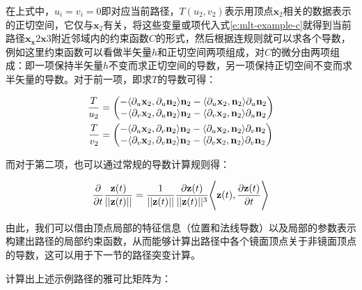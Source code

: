 在上式中，$u_i=v_i=0$即对应当前路径，$T(u_2,v_2)$表示用顶点$\mathbf{x}_2$相关的数据表示的正切空间，它仅与$\mathbf{x}_2$有关，将这些变量或项代入式\ref{e:mlt-example-c}就得到当前路径$\mathbf{x}_\mathbf{x}2\mathbf{x}3$附近邻域内的约束函数$C$的形式，然后根据连规则就可以求各个导数，例如这里约束函数可以看做半矢量$h$和正切空间两项组成，对$C$的微分由两项组成：即一项保持半矢量$h$不变而求正切空间的导数，另一项保持正切空间不变而求半矢量的导数。对于前一项，即求$T$的导数可得：

\begin{equation}
\begin{aligned}
	\frac{T}{u_2}&=\begin{pmatrix}
		-\langle{\rm \partial}_u\mathbf{x}_2,{\rm \partial}_u\mathbf{n}_2\rangle\mathbf{n}_2-\langle{\rm \partial}_u\mathbf{x}_2,\mathbf{n}_2\rangle{\rm \partial}_u\mathbf{n}_2\\
		-\langle{\rm \partial}_v\mathbf{x}_2,{\rm \partial}_u\mathbf{n}_2\rangle\mathbf{n}_2-\langle{\rm \partial}_v\mathbf{x}_2,\mathbf{n}_2\rangle{\rm \partial}_u\mathbf{n}_2
	\end{pmatrix}\\
	\frac{T}{v_2}&=\begin{pmatrix}
		-\langle{\rm \partial}_u\mathbf{x}_2,{\rm \partial}_v\mathbf{n}_2\rangle\mathbf{n}_2-\langle{\rm \partial}_u\mathbf{x}_2,\mathbf{n}_2\rangle{\rm \partial}_v\mathbf{n}_2\\
		-\langle{\rm \partial}_v\mathbf{x}_2,{\rm \partial}_v\mathbf{n}_2\rangle\mathbf{n}_2-\langle{\rm \partial}_v\mathbf{x}_2,\mathbf{n}_2\rangle{\rm \partial}_v\mathbf{n}_2
	\end{pmatrix}
\end{aligned}
\end{equation}

\noindent 而对于第二项，也可以通过常规的导数计算规则得：

\begin{equation}
	\frac{{\rm \partial}}{{\rm \partial} t}\frac{\mathbf{z}(t)}{||\mathbf{z}(t)||}=\frac{1}{||\mathbf{z}(t)||}\frac{{\rm \partial}\mathbf{z}(t)}{||\mathbf{z}(t)||^{3}}\Bigg\langle\mathbf{z}(t),\frac{{\rm \partial}\mathbf{z}(t)}{{\rm \partial} t}\Bigg\rangle
\end{equation}

由此，我们可以借由顶点局部的特征信息（位置和法线导数）以及局部的参数表示构建出路径的局部约束函数，从而能够计算出路径中各个镜面顶点关于非镜面顶点的导数，这可以用于下一节的路径突变计算。

\cite{a:LIGHTTRANSPORTONPATHSPACEMANIFOLDS}计算出上述示例路径的雅可比矩阵为：

